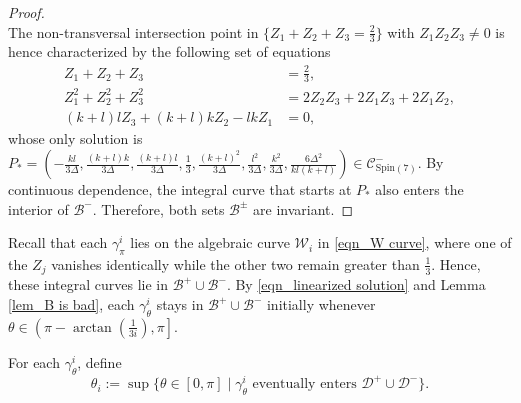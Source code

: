 \documentclass[11pt,letterpaper]{amsart}
\theoremstyle{definition}
\numberwithin{equation}{section}
\newcommand{\spin}{\mathrm{Spin}}
\begin{document}
\begin{proof}
\begin{equation}
\end{equation}
The non-transversal intersection point in $\{Z_1+Z_2+Z_3=\frac{2}{3}\}$ with $Z_1Z_2Z_3\neq 0$ is hence characterized by the following set of equations
\begin{equation}
\begin{split}
Z_1+Z_2+Z_3&=\frac{2}{3},\\
Z_1^2+Z_2^2+Z_3^2&=2Z_2Z_3+2Z_1Z_3+2Z_1Z_2,\\
(k+l)lZ_3+(k+l)kZ_2-lkZ_1&=0,
\end{split}
\end{equation}
whose only solution is $P_*=(-\frac{kl}{3\Delta},\frac{(k+l)k}{3\Delta},\frac{(k+l)l}{3\Delta},\frac{1}{3},\frac{(k+l)^2}{3\Delta},\frac{l^2}{3\Delta},\frac{k^2}{3\Delta},\frac{6\Delta^2}{kl(k+l)})\in \mathcal{C}^-_{\spin(7)}$. By continuous dependence, the integral curve that starts at $P_*$ also enters the interior of $\mathcal{B}^-$. Therefore, both sets $\mathcal{B}^\pm$ are invariant.
\end{proof}

Recall that each $\gamma_\pi^i$ lies on the algebraic curve $\mathcal{W}_i$ in \eqref{eqn_W curve}, where one of the $Z_j$ vanishes identically while the other two remain greater than $\frac{1}{3}$. Hence, these integral curves lie in $\mathcal{B}^+\cup \mathcal{B}^-$. By \eqref{eqn_linearized solution} and Lemma \ref{lem_B is bad}, each $\gamma_\theta^i$ stays in $\mathcal{B}^+\cup \mathcal{B}^-$ initially whenever $\theta\in\left(\pi-\arctan\left(\frac{1}{3i}\right),\pi\right]$.

For each $\gamma_\theta^i$, define 
$$\theta_i:=\sup \{\theta \in [0,\pi]\mid \gamma_\theta^i\text{ eventually enters }\mathcal{D}^+\cup \mathcal{D}^-\}.$$
\end{document}
